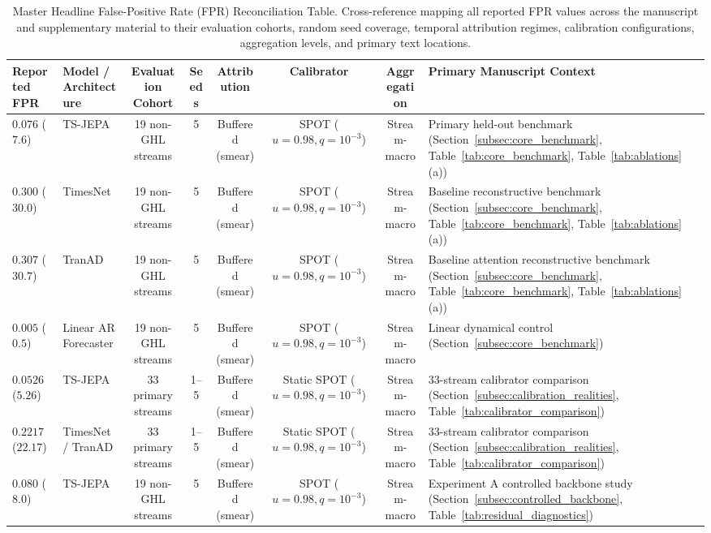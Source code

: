 \begin{table}[t]
\centering
\scriptsize
\caption{Master Headline False-Positive Rate (FPR) Reconciliation Table. Cross-reference mapping all reported FPR values across the manuscript and supplementary material to their evaluation cohorts, random seed coverage, temporal attribution regimes, calibration configurations, aggregation levels, and primary text locations.}\label{tab:master_fpr_reconciliation}
\scriptsize
\setlength{\tabcolsep}{2.5pt}
\begin{tabular}{@{}llcccccp{4.8cm}@{}}
\toprule
\textbf{Reported FPR} & \textbf{Model / Architecture} & \textbf{Evaluation Cohort} & \textbf{Seeds} & \textbf{Attribution} & \textbf{Calibrator} & \textbf{Aggregation} & \textbf{Primary Manuscript Context} \\
\midrule
$0.076$ ($7.6$) & TS-JEPA & 19 non-GHL streams & 5 & Buffered (smear) & SPOT ($u{=}0.98, q{=}10^{-3}$) & Stream-macro & Primary held-out benchmark (Section~\ref{subsec:core_benchmark}, Table~\ref{tab:core_benchmark}, Table~\ref{tab:ablations}(a)) \\
$0.300$ ($30.0$) & TimesNet & 19 non-GHL streams & 5 & Buffered (smear) & SPOT ($u{=}0.98, q{=}10^{-3}$) & Stream-macro & Baseline reconstructive benchmark (Section~\ref{subsec:core_benchmark}, Table~\ref{tab:core_benchmark}, Table~\ref{tab:ablations}(a)) \\
$0.307$ ($30.7$) & TranAD & 19 non-GHL streams & 5 & Buffered (smear) & SPOT ($u{=}0.98, q{=}10^{-3}$) & Stream-macro & Baseline attention reconstructive benchmark (Section~\ref{subsec:core_benchmark}, Table~\ref{tab:core_benchmark}, Table~\ref{tab:ablations}(a)) \\
$0.005$ ($0.5$) & Linear AR Forecaster & 19 non-GHL streams & 5 & Buffered (smear) & SPOT ($u{=}0.98, q{=}10^{-3}$) & Stream-macro & Linear dynamical control (Section~\ref{subsec:core_benchmark}) \\
$0.0526$ ($5.26$) & TS-JEPA & 33 primary streams & 1--5 & Buffered (smear) & Static SPOT ($u{=}0.98, q{=}10^{-3}$) & Stream-macro & 33-stream calibrator comparison (Section~\ref{subsec:calibration_realities}, Table~\ref{tab:calibrator_comparison}) \\
$0.2217$ ($22.17$) & TimesNet / TranAD & 33 primary streams & 1--5 & Buffered (smear) & Static SPOT ($u{=}0.98, q{=}10^{-3}$) & Stream-macro & 33-stream calibrator comparison (Section~\ref{subsec:calibration_realities}, Table~\ref{tab:calibrator_comparison}) \\
$0.080$ ($8.0$) & TS-JEPA & 19 non-GHL streams & 5 & Buffered (smear) & SPOT ($u{=}0.98, q{=}10^{-3}$) & Stream-macro & Experiment A controlled backbone study (Section~\ref{subsec:controlled_backbone}, Table~\ref{tab:residual_diagnostics}) \\

\end{tabular}
\end{table}
